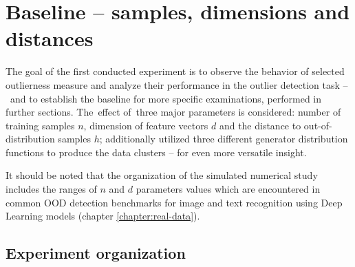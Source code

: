 \section{Baseline – samples, dimensions and distances}
\label{section:distributions-experiment}

The goal of the first conducted experiment is to observe the behavior of selected outlierness measure and analyze their performance in the outlier detection task –~and to establish the baseline for more specific examinations, performed in further sections. The~effect of~three major parameters is considered: number of training samples $n$, dimension of feature vectors $d$ and the distance to out-of-distribution samples $h$; additionally utilized three different generator distribution functions to produce the data clusters – for even more versatile insight.

It should be noted that the organization of the simulated numerical study includes the ranges of $n$ and $d$ parameters values which are encountered in common OOD detection benchmarks for image and text recognition using Deep Learning models (chapter \ref{chapter:real-data}).


\subsection{Experiment organization}
\label{section:distributions-organization}

